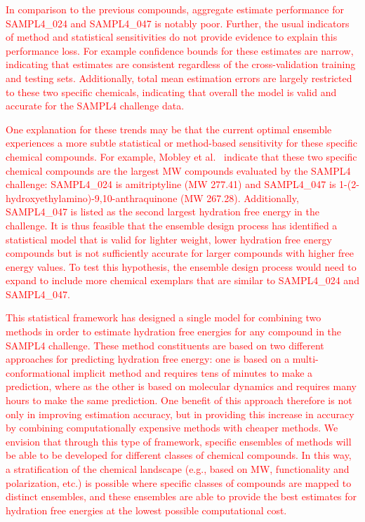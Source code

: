 \documentclass[journal=jpcbfk, manuscript=article]{achemso}
\newcommand{\+}[1]{\ensuremath{\mathbf{#1}}}
\newcommand{\rev}[1]{\textsf{\textcolor{red}{#1}}}
\begin{document}
\rev{In comparison to the previous compounds, aggregate estimate performance for SAMPL4\_024 and SAMPL4\_047 is notably poor.
Further, the usual indicators of method and statistical sensitivities do not provide evidence to explain this performance loss.
For example confidence bounds for these estimates are narrow, indicating that estimates are consistent regardless of the cross-validation training and testing sets.
Additionally, total mean estimation errors are largely restricted to these two specific chemicals, indicating that overall the model is valid and accurate for the SAMPL4 challenge data.}
 
\rev{One explanation for these trends may be that the current optimal ensemble experiences a more subtle statistical or method-based sensitivity for these specific chemical compounds. 
For example, Mobley et al.~\cite{Mobley:2014} indicate that these two specific chemical compounds are the largest MW compounds evaluated by the SAMPL4 challenge: SAMPL4\_024 is amitriptyline (MW 277.41) and SAMPL4\_047 is 1-(2-hydroxyethylamino)-9,10-anthraquinone (MW 267.28).
Additionally, SAMPL4\_047 is listed as the second largest hydration free energy in the challenge.
It is thus feasible that the ensemble design process has identified a statistical model that is valid for lighter weight, lower hydration free energy compounds but is not sufficiently accurate for larger compounds with higher free energy values.
To test this hypothesis, the ensemble design process would need to expand to include more chemical exemplars that are similar to SAMPL4\_024 and SAMPL4\_047.}

\rev{This statistical framework has designed a single model for combining two methods in order to estimate hydration free energies for any compound in the SAMPL4 challenge.
These method constituents are based on two different approaches for predicting hydration free energy: one is based on a multi-conformational implicit method and requires tens of minutes to make a prediction, where as the other is based on molecular dynamics and requires many hours to make the same prediction. 
One benefit of this approach therefore is not only in improving estimation accuracy, but in providing this increase in accuracy by combining computationally expensive methods with cheaper methods.
We envision that through this type of framework, specific ensembles of methods will be able to be developed for different classes of chemical compounds.
In this way, a stratification of the chemical landscape (e.g., based on MW, functionality and polarization, etc.) is possible where specific classes of  compounds are mapped to distinct ensembles, and these ensembles are able to provide the best estimates for hydration free energies at the lowest possible computational cost.}
\end{document}
